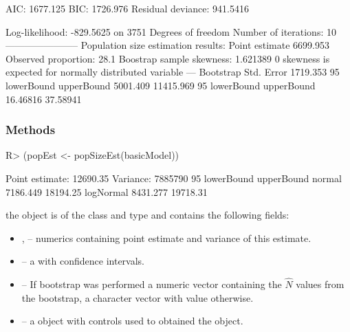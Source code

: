 \documentclass[
]{jss}
\newcommand{\1}{\mathcal{I}} \newcommand{\bx}{\boldsymbol{x}}
\begin{document}
\begin{CodeChunk}
\begin{CodeOutput}
AIC: 1677.125
BIC: 1726.976
Residual deviance: 941.5416

Log-likelihood: -829.5625 on 3751 Degrees of freedom 
Number of iterations: 10
-----------------------
Population size estimation results: 
Point estimate 6699.953
Observed proportion: 28.1%
Boostrap sample skewness: 1.621389
0 skewness is expected for normally distributed variable
---
Bootstrap Std. Error 1719.353
95%
lowerBound upperBound 
  5001.409  11415.969 
95%
lowerBound upperBound 
  16.46816   37.58941 
\end{CodeOutput}
\end{CodeChunk}

\subsubsection{Methods}\label{methods}

\begin{CodeChunk}
\begin{CodeInput}
R> (popEst <- popSizeEst(basicModel))
\end{CodeInput}
\begin{CodeOutput}
Point estimate: 12690.35
Variance: 7885790
95%
          lowerBound upperBound
normal      7186.449   18194.25
logNormal   8431.277   19718.31
\end{CodeOutput}
\end{CodeChunk}

the  object is of the  class and
 type and contains the following fields:

\begin{itemize}
  \item {},  -- numerics containing point estimate and variance of this estimate.
  \item {} -- a  with confidence intervals.
  \item {} -- If bootstrap was performed a numeric vector containing the $\hat{N}$ values from the bootstrap, 
  a character vector with value  otherwise.
  \item {} -- a  object with controls used to obtained the object.
\end{itemize}

\small
\end{document}
